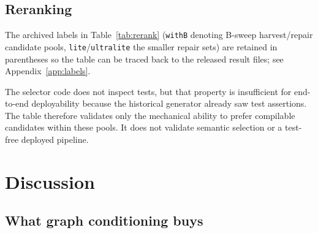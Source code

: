 \documentclass[11pt]{article}
\begin{document}
\subsection{Reranking}

\begin{table}[t]
\centering
\small
\caption{Historical reranking diagnostic on contaminated candidate pools. The selector itself does not read tests, but its generated inputs were test-informed; these rates are not deployable end-to-end evidence.}
\label{tab:rerank}
\end{table}

The archived labels in Table~\ref{tab:rerank} (\texttt{withB} denoting B-sweep harvest/repair candidate pools, \texttt{lite}/\texttt{ultralite} the smaller repair sets) are retained in parentheses so the table can be traced back to the released result files; see Appendix~\ref{app:labels}.

The selector code does not inspect tests, but that property is insufficient for end-to-end deployability because the historical generator already saw test assertions. The table therefore validates only the mechanical ability to prefer compilable candidates within these pools. It does not validate semantic selection or a test-free deployed pipeline.

\section{Discussion}

\subsection{What graph conditioning buys}
\end{document}
